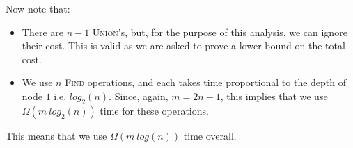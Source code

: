 \documentclass[a4paper,11pt]{scrartcl}
\begin{document}
Now note that:
\begin{itemize}
    \item There are $n - 1$ \textsc{Union}'s, but, for the purpose of this analysis, we can ignore their cost. This is valid as we are asked to prove a lower bound on the total cost.
    \item We use $n$ \textsc{Find} operations, and each takes time proportional to the depth of node $1$ i.e. $log_2(n)$. Since, again, $m = 2n - 1$, this implies that we use $\Omega(m\ log_2(n))$ time for these operations.
\end{itemize}
This means that we use $\Omega(m\ log(n))$ time overall.
\end{document}
